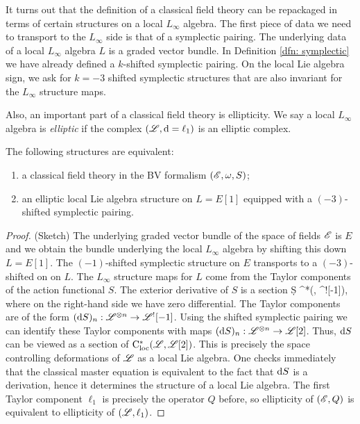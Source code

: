 \documentclass[10pt]{amsart}
\begin{document}
It turns out that the definition of a classical field theory can be repackaged in terms of certain structures on a local $L_\infty$ algebra.
The first piece of data we need to transport to the $L_\infty$ side is that of a symplectic pairing. 
The underlying data of a local $L_\infty$ algebra $L$ is a graded vector bundle. 
In Definition \ref{dfn: symplectic} we have already defined a $k$-shifted symplectic pairing. 
On the local Lie algebra sign, we ask for $k=-3$ shifted symplectic structures that are also invariant for the $L_\infty$ structure maps. 

Also, an important part of a classical field theory is ellipticity. 
We say a local $L_\infty$ algebra is {\em elliptic} if the complex $(\mathscr L, {\rm d} = \ell_1)$ is an elliptic complex.

\begin{prop}
The following structures are equivalent:
\begin{enumerate}
\item a classical field theory in the BV formalism $(\mathscr E, \omega, S)$;
\item an elliptic local Lie algebra structure on $L = E [1]$ equipped with a $(-3)$-shifted symplectic pairing.
\end{enumerate}
\end{prop}

\begin{proof} (Sketch) 
The underlying graded vector bundle of the space of fields $\mathscr E$ is $E$ and we obtain the bundle underlying the local $L_\infty$ algebra by shifting this down $L = E[1]$. 
The $(-1)$-shifted symplectic structure on $E$ transports to a $(-3)$-shifted on on $L$. 
The $L_\infty$ structure maps for $L$ come from the Taylor components of the action functional $S$. 
The exterior derivative of $S$ is a section
\ben
\d S \in \cloc^*(\sL, \sL^![-1]),
\een
where on the right-hand side we have zero differential.
The Taylor components are of the form $({\rm d} S)_n : \mathscr L^{\otimes n} \to \mathscr L^![-1]$. 
Using the shifted symplectic pairing we can identify these Taylor components with maps $({\rm d} S)_n : \mathscr L^{\otimes n} \to \mathscr L[2]$. 
Thus, ${\rm d} S$ can be viewed as a section of ${\rm C}_{\rm loc}^*(\mathscr L, \mathscr L[2])$. 
This is precisely the space controlling deformations of $\mathscr L$ as a local Lie algebra.
One checks immediately that the classical master equation is equivalent to the fact that ${\rm d} S$ is a derivation, hence it determines the structure of a local Lie algebra. 
The first Taylor component $\ell_1$ is precisely the operator $Q$ before, so ellipticity of $(\mathscr E, Q)$ is equivalent to ellipticity of $(\mathscr L, \ell_1)$. 
\end{proof}
\end{document}
